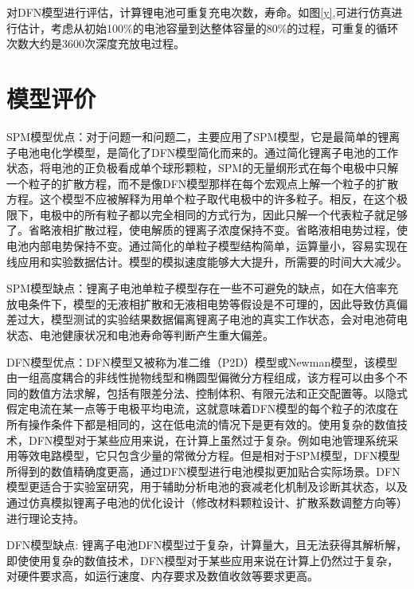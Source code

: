 \documentclass[12pt]{ctexart}%
\begin{document}
对DFN模型进行评估，计算锂电池可重复充电次数，寿命。如图\ref{y},可进行仿真进行估计，考虑从初始100\%的电池容量到达整体容量的80\%的过程，可重复的循环次数大约是3600次深度充放电过程。
\section{模型评价}
SPM模型优点：对于问题一和问题二，主要应用了SPM模型，它是最简单的锂离子电池电化学模型，是简化了DFN模型简化而来的。通过简化锂离子电池的工作状态，将电池的正负极看成单个球形颗粒，SPM的无量纲形式在每个电极中只解一个粒子的扩散方程，而不是像DFN模型那样在每个宏观点上解一个粒子的扩散方程。这个模型不应被解释为用单个粒子取代电极中的许多粒子。相反，在这个极限下，电极中的所有粒子都以完全相同的方式行为，因此只解一个代表粒子就足够了。省略液相扩散过程，使电解质的锂离子浓度保持不变。省略液相电势过程，使电池内部电势保持不变。通过简化的单粒子模型结构简单，运算量小，容易实现在线应用和实验数据估计。模型的模拟速度能够大大提升，所需要的时间大大减少。

SPM模型缺点：锂离子电池单粒子模型存在一些不可避免的缺点，如在大倍率充放电条件下，模型的无液相扩散和无液相电势等假设是不可理的，因此导致仿真偏差过大，模型测试的实验结果数据偏离锂离子电池的真实工作状态，会对电池荷电状态、电池健康状况和电池寿命等判断产生重大偏差。

DFN模型优点：DFN模型又被称为准二维（P2D）模型或Newman模型，该模型由一组高度耦合的非线性抛物线型和椭圆型偏微分方程组成，该方程可以由多个不同的数值方法求解，包括有限差分法、控制体积、有限元法和正交配置等。以隐式假定电流在某一点等于电极平均电流，这就意味着DFN模型的每个粒子的浓度在所有操作条件下都是相同的，这在低电流的情况下是更有效的。使用复杂的数值技术，DFN模型对于某些应用来说，在计算上虽然过于复杂。例如电池管理系统采用等效电路模型，它只包含少量的常微分方程。但是相对于SPM模型，DFN模型所得到的数值精确度更高，通过DFN模型进行电池模拟更加贴合实际场景。DFN模型更适合于实验室研究，用于辅助分析电池的衰减老化机制及诊断其状态，以及通过仿真模拟锂离子电池的优化设计（修改材料颗粒设计、扩散系数调整方向等）进行理论支持。

DFN模型缺点:
锂离子电池DFN模型过于复杂，计算量大，且无法获得其解析解，即使使用复杂的数值技术，DFN模型对于某些应用来说在计算上仍然过于复杂，对硬件要求高，如运行速度、内存要求及数值收敛等要求更高。 
\end{document}
